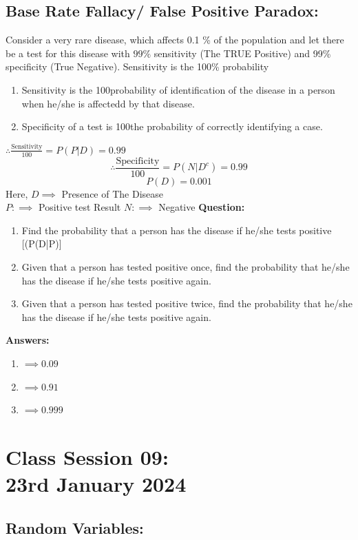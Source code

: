 \documentclass{article}
\theoremstyle{definition}
\begin{document}
{\subsection{Base Rate Fallacy/ False Positive Paradox:}
Consider a very rare disease, which affects 0.1 \% of the population and let there be a test for this disease with $99\%$ sensitivity (The TRUE Positive) and 99\% specificity (True Negative). Sensitivity  is the 100\% probability
\begin{enumerate}[label= Roman]
    \item Sensitivity is the 100\times probability of identification of the disease in a person when he/she is affectedd by that disease.
    \item Specificity of a test is 100\times the probability of correctly identifying a case.
\end{enumerate}

$\therefore \frac{\text{Sensitivity}}{100} = P(P|D) = 0.99$
$$\therefore \frac{\text{Specificity}}{100} = P(N|D^c) = 0.99$$
$$P(D) = 0.001$$
Here,
$D\implies$ Presence of The Disease\\
$P: \implies$ Positive test Result
$N: \implies $ Negative 
\textbf{Question:} 
\begin{enumerate}
    \item Find the probability that a person has the disease if he/she tests positive [(P(D|P)]
    \item Given that a person has tested positive once, find the probability that he/she has the disease if he/she tests positive again.
     \item Given that a person has tested positive twice, find the probability that he/she has the disease if he/she tests positive again.
\end{enumerate}
\textbf{Answers:}
\begin{enumerate}
    \item $\implies 0.09$
    \item $\implies 0.91$
    \item $\implies 0.999$
\end{enumerate}


\section{Class Session 09: \\23rd January 2024}
\subsection{Random Variables:}
}
\end{document}
